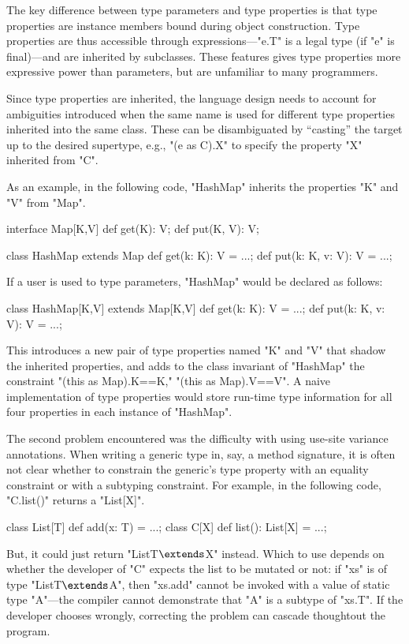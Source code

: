The key difference between type parameters and type properties
is that type properties are
instance members bound during object construction.  Type
properties are thus accessible through expressions---\xcd"e.T" is
a legal type (if \xcd"e" is final)---and are inherited by subclasses.
These features gives type properties more expressive power than
parameters, but are unfamiliar to many programmers.

Since type properties are inherited, the language design needs
to account for ambiguities introduced when the same name is
used for different type properties inherited into the same class.
These can be disambiguated
by ``casting'' the target up to the desired supertype,
e.g., \xcd"(e as C).X"
to specify the property \xcd"X" inherited from \xcd"C".

As an example, in the following \Xten code, \xcd"HashMap" 
inherits the properties \xcd"K" and \xcd"V" from \xcd"Map".
\begin{xten}
interface Map[K,V] {
    def get(K): V;
    def put(K, V): V;
}

class HashMap extends Map {
    def get(k: K): V = ...;
    def put(k: K, v: V): V = ...;
}
\end{xten}
If a user is used to type parameters, \xcd"HashMap" would be
declared as follows:
\begin{xten}
class HashMap[K,V] extends Map[K,V] {
    def get(k: K): V = ...;
    def put(k: K, v: V): V = ...;
}
\end{xten}
This introduces a new pair of type properties named \xcd"K" and
\xcd"V" that shadow the inherited properties,
and adds to the class invariant of \xcd"HashMap" the constraint
\xcd"{(this as Map).K==K," \xcd"(this as Map).V==V}".
A naive implementation of type properties would store run-time
type information for all four properties in each instance
of \xcd"HashMap".

\ifwild
The second problem encountered was the difficulty with using use-site
variance annotations.
When writing a generic type in, say, a method signature, it is often not 
clear whether to constrain the generic's type property with an
equality constraint or with a subtyping constraint.
For example, in the following code, \xcd"C.list()" returns a \xcd"List[X]".
\begin{xtenmath}
class List[T] {
    def add(x: T) = ...;
}
class C[X] {
    def list(): List[X] = ...;
}
\end{xtenmath}
\noindent
But, it could just return
\xcdmath"List{T$\extends$X}" instead.
Which to use depends on whether the developer of \xcd"C"
expects the list to be mutated or not: if \xcd"xs"
is of type
\xcdmath"List{T$\extends$A}", then \xcd"xs.add" cannot be
invoked with a value of static type \xcd"A"---the compiler
cannot demonstrate that \xcd"A" is a subtype of \xcd"xs.T".
If the developer chooses wrongly, correcting the problem can
cascade thoughtout the program.
\fi


